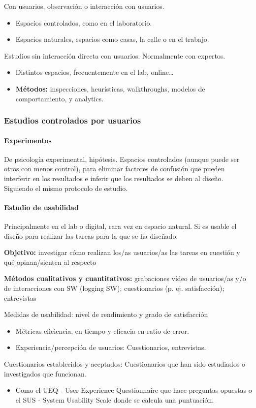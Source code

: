 \documentclass[12pt, twoside, openright]{report} %
\begin{document}
Con usuarios, observación o interacción con usuarios.
\begin{itemize}
  \item Espacios controlados, como en el laboratorio.
  \item Espacios naturales, espacios como casas, la calle o en el trabajo.
\end{itemize}

Estudios sin interacción directa con usuarios. Normalmente con expertos.
\begin{itemize}
  \item Distintos espacios, frecuentemente en el lab, online…
  \item \textbf{Métodos:} inspecciones, heurísticas, walkthroughs, modelos de comportamiento, y analytics. 
\end{itemize}

\subsubsection{Estudios controlados por usuarios}
\paragraph{Experimentos}        
 De psicología experimental, hipótesis. Espacios controlados (aunque puede ser otros con menos control), para eliminar factores de confusión que pueden interferir en los resultados e inferir que los resultados se deben al diseño. Siguiendo el mismo protocolo de estudio.

\paragraph{Estudio de usabilidad}        
Principalmente en el lab o digital, rara vez en espacio natural. Si es usable el diseño para realizar las tareas para la que se ha diseñado.

\textbf{Objetivo:} investigar cómo realizan los/as usuarios/as las tareas en cuestión y qué opinan/sienten al respecto

\textbf{Métodos cualitativos y cuantitativos:} grabaciones vídeo de usuarios/as y/o de interacciones con SW (logging SW); cuestionarios (p. ej. satisfacción); entrevistas

Medidas de usabilidad: nivel de rendimiento y grado de satisfacción
\begin{itemize}
  \item Métricas eficiencia, en tiempo y eficacia en ratio de error.
  \item Experiencia/percepción de usuarios: Cuestionarios, entrevistas.
\end{itemize}      
Cuestionarios establecidos y aceptados: Cuestionarios que han sido estudiados o investigados que funcionan.
\begin{itemize}
  \item Como el UEQ - User Experience Questionnaire que hace preguntas opuestas o el SUS - System Usability Scale donde se calcula una puntuación.
\end{itemize}
\end{document}
